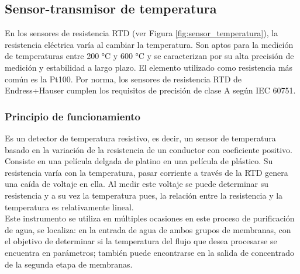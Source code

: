 \subsection{Sensor-transmisor de temperatura}

En los sensores de resistencia RTD (ver Figura \ref{fig:sensor_temperatura}), la resistencia
eléctrica varía al cambiar la temperatura. Son aptos para la medición de
temperaturas entre 200 °C y 600 °C y se caracterizan por su alta precisión de
medición y estabilidad a largo plazo. El elemento utilizado como resistencia más
común es la Pt100. Por norma, los sensores de resistencia RTD de
Endress+Hauser cumplen los requisitos de precisión de clase A según IEC
60751.\\

\subsubsection*{Principio de funcionamiento}

Es un detector de temperatura resistivo, es decir, un sensor de
temperatura basado en la variación de la resistencia de un conductor con
coeficiente positivo. Consiste en una película delgada de platino en una película
de plástico. Su resistencia varía con la temperatura, pasar corriente a través de
la RTD genera una caída de voltaje en ella. Al medir este voltaje se puede
determinar su resistencia y a su vez la temperatura pues, la relación entre la
resistencia y la temperatura es relativamente lineal.\\

Este instrumento se utiliza en múltiples ocasiones en este proceso de
purificación de agua, se localiza: en la entrada de agua de ambos grupos de
membranas, con el objetivo de determinar si la temperatura del flujo que desea
procesarse se encuentra en parámetros; también puede encontrarse en la salida
de concentrado de la segunda etapa de membranas.\\



